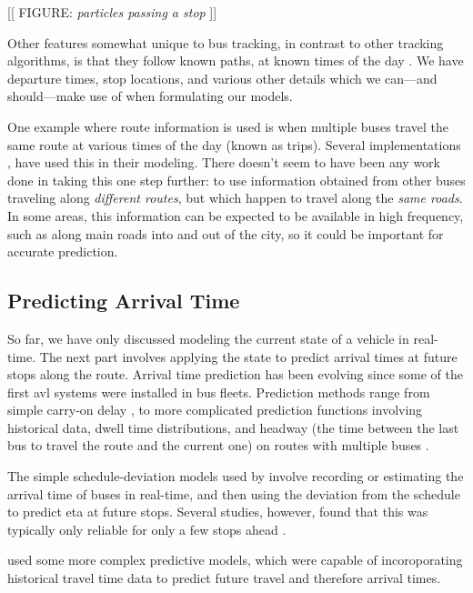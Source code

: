 \documentclass[12pt,a4paper]{article}
\begin{document}
[[ FIGURE: \emph{particles passing a stop} ]]


Other features somewhat unique to bus tracking, 
in contrast to other tracking algorithms,
is that they follow known paths, at known times of the day \citep{cathey-dailey:2003}.
We have departure times, stop locations, 
and various other details which we can---and should---make use of 
when formulating our models.


One example where route information is used is when multiple buses travel the same 
route at various times of the day (known as trips).
Several implementations \citep{yu-etal:2011,hans-etal:2015},
have used this in their modeling.
There doesn't seem to have been any work done in taking this one step further:
to use information obtained from other buses traveling along \emph{different routes},
but which happen to travel along the \emph{same roads}.
In some areas, this information can be expected to be available in high frequency,
such as along main roads into and out of the city,
so it could be important for accurate prediction.



\subsection{Predicting Arrival Time}
\label{sec:arrivaltimeprediction}

So far, we have only discussed modeling the current state of a vehicle in real-time.
The next part involves applying the state to predict arrival times at future stops along the route.
Arrival time prediction has been evolving since some of the first \gls{avl}
systems were installed in bus fleets.
Prediction methods range from simple carry-on delay \citep{cn},
to more complicated prediction functions involving historical data,
dwell time distributions, 
and headway (the time between the last bus to travel the route and the current one)
on routes with multiple buses 
\citep{cn}.


The simple schedule-deviation models used by \cite{dailey:2001} involve
recording or estimating the arrival time of buses in real-time,
and then using the deviation from the schedule to predict \gls{eta}
at future stops.
Several studies, however, found that this was typically only reliable for only a few stops ahead
\citep{cn}.


\cite{cathey-dailey:2003} used some more complex predictive models, 
which were capable of incoroporating historical travel time
data to predict future travel and therefore arrival times.
\end{document}
